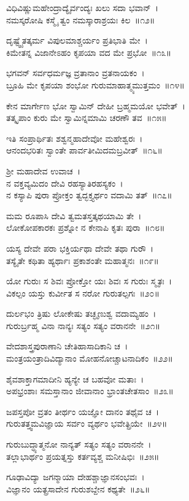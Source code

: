 ವಿಧಿವಿಷ್ಣುಮಹೇಂದ್ರಾದ್ಯೈರ್ವಂದ್ಯಃ ಖಲು ಸದಾ ಭವಾನ್~।\\
ನಮಸ್ಕರೋಷಿ ಕಸ್ಮೈ ತ್ವಂ ನಮಸ್ಕಾರಾಶ್ರಯಃ ಕಿಲ~॥೧೨॥

ದೃಷ್ಟ್ವೈತತ್ಕರ್ಮ ವಿಪುಲಮಾಶ್ಚರ್ಯಂ ಪ್ರತಿಭಾತಿ ಮೇ~।\\
ಕಿಮೇತನ್ನ ವಿಜಾನೇಽಹಂ ಕೃಪಯಾ ವದ ಮೇ ಪ್ರಭೋ~॥೧೩॥

ಭಗವನ್ ಸರ್ವಧರ್ಮಜ್ಞ ವ್ರತಾನಾಂ ವ್ರತನಾಯಕಂ~।\\
ಬ್ರೂಹಿ ಮೇ ಕೃಪಯಾ ಶಂಭೋ ಗುರುಮಾಹಾತ್ಮ್ಯಮುತ್ತಮಂ~॥೧೪॥

ಕೇನ ಮಾರ್ಗೇಣ ಭೋ ಸ್ವಾಮಿನ್ ದೇಹೀ ಬ್ರಹ್ಮಮಯೋ ಭವೇತ್~।\\
ತತ್ಕೃಪಾಂ ಕುರು ಮೇ ಸ್ವಾಮಿನ್ನಮಾಮಿ ಚರಣೌ ತವ~॥೧೫॥

ಇತಿ ಸಂಪ್ರಾರ್ಥಿತಃ ಶಶ್ವನ್ಮಹಾದೇವೋ ಮಹೇಶ್ವರಃ~।\\
ಆನಂದಭರಿತಃ ಸ್ವಾಂತೇ ಪಾರ್ವತೀಮಿದಮಬ್ರವೀತ್~॥೧೬॥

ಶ್ರೀ ಮಹಾದೇವ ಉವಾಚ~।\\
ನ ವಕ್ತವ್ಯಮಿದಂ ದೇವಿ ರಹಸ್ಯಾತಿರಹಸ್ಯಕಂ~।\\
ನ ಕಸ್ಯಾಪಿ ಪುರಾ ಪ್ರೋಕ್ತಂ ತ್ವದ್ಭಕ್ತ್ಯರ್ಥಂ ವದಾಮಿ ತತ್~॥೧೭॥

ಮಮ ರೂಪಾಸಿ ದೇವಿ ತ್ವಮತಸ್ತತ್ಕಥಯಾಮಿ ತೇ~।\\
ಲೋಕೋಪಕಾರಕಃ ಪ್ರಶ್ನೋ ನ ಕೇನಾಪಿ ಕೃತಃ ಪುರಾ~॥೧೮॥

ಯಸ್ಯ ದೇವೇ ಪರಾ ಭಕ್ತಿರ್ಯಥಾ ದೇವೇ ತಥಾ ಗುರೌ~।\\
ತಸ್ಯೈತೇ ಕಥಿತಾ ಹ್ಯರ್ಥಾಃ ಪ್ರಕಾಶಂತೇ ಮಹಾತ್ಮನಃ~॥೧೯॥

ಯೋ ಗುರುಃ ಸ ಶಿವಃ ಪ್ರೋಕ್ತೋ ಯಃ ಶಿವಃ ಸ ಗುರುಃ ಸ್ಮೃತಃ~।\\
ವಿಕಲ್ಪಂ ಯಸ್ತು ಕುರ್ವೀತ ಸ ನರೋ ಗುರುತಲ್ಪಗಃ~॥೨೦॥

ದುರ್ಲಭಂ ತ್ರಿಷು ಲೋಕೇಷು ತಚ್ಛೃಣುಶ್ವ ವದಾಮ್ಯಹಂ~।\\
ಗುರುರ್ಬ್ರಹ್ಮ ವಿನಾ ನಾನ್ಯಃ ಸತ್ಯಂ ಸತ್ಯಂ ವರಾನನೇ~॥೨೧॥

ವೇದಶಾಸ್ತ್ರಪುರಾಣಾನಿ ಚೇತಿಹಾಸಾದಿಕಾನಿ ಚ~।\\
ಮಂತ್ರಯಂತ್ರಾದಿವಿದ್ಯಾನಾಂ ಮೋಹನೋಚ್ಚಾಟನಾದಿಕಂ~॥೨೨॥

ಶೈವಶಾಕ್ತಾಗಮಾದೀನಿ ಹ್ಯನ್ಯೇ ಚ ಬಹವೋ ಮತಾಃ~।\\
ಅಪಭ್ರಂಶಾಃ ಸಮಸ್ತಾನಾಂ ಜೀವಾನಾಂ ಭ್ರಾಂತಚೇತಸಾಂ~॥೨೩॥

ಜಪಸ್ತಪೋ ವ್ರತಂ ತೀರ್ಥಂ ಯಜ್ಞೋ ದಾನಂ ತಥೈವ ಚ~।\\
ಗುರುತತ್ತ್ವಮವಿಜ್ಞಾಯ ಸರ್ವಂ ವ್ಯರ್ಥಂ ಭವೇತ್ಪ್ರಿಯೇ~॥೨೪॥

ಗುರುಬುದ್ಧ್ಯಾತ್ಮನೋ ನಾನ್ಯತ್ ಸತ್ಯಂ ಸತ್ಯಂ ವರಾನನೇ~।\\
ತಲ್ಲಾಭಾರ್ಥಂ ಪ್ರಯತ್ನಸ್ತು ಕರ್ತವ್ಯಶ್ಚ ಮನೀಷಿಭಿಃ~॥೨೫॥

ಗೂಢಾವಿದ್ಯಾ ಜಗನ್ಮಾಯಾ ದೇಹಶ್ಚಾಜ್ಞಾನಸಂಭವಃ~।\\
ವಿಜ್ಞಾನಂ ಯತ್ಪ್ರಸಾದೇನ ಗುರುಶಬ್ದೇನ ಕಥ್ಯತೇ~॥೨೬॥

